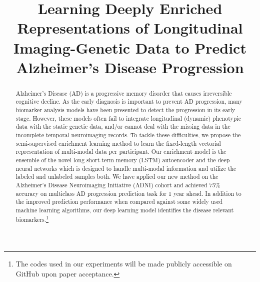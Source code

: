 \documentclass[runningheads]{llncs}
\begin{document}
%
\title{Learning Deeply Enriched Representations of Longitudinal Imaging-Genetic Data to Predict Alzheimer's Disease Progression}
%
%
%
%
%
\maketitle              %
%
\begin{abstract}
Alzheimer’s Disease (AD) is a progressive memory disorder that causes irreversible cognitive decline. As the early diagnosis is important to prevent AD progression, many biomarker analysis models have been presented to detect the progression in its early stage. However, these models often fail to integrate longitudinal (dynamic) phenotypic data with the static genetic data, and/or cannot deal with the missing data in the incomplete temporal neuroimaging records. To tackle these difficulties, we propose the semi-supervised enrichment learning method to learn the fixed-length vectorial representation of multi-modal data per participant. Our enrichment model is the ensemble of the novel long short-term memory (LSTM) autoencoder and the deep neural networks which is designed to handle multi-modal information and utilize the labeled and unlabeled samples both. We have applied our new method on the Alzheimer's Disease Neuroimaging Initiative (ADNI) cohort and achieved 75\% accuracy on multiclass AD progression prediction task for 1 year ahead. In addition to the improved prediction performance when compared against some widely used machine learning algorithms, our deep learning model identifies the disease relevant biomarkers.\footnote{The codes used in our experiments will be made publicly accessible on GitHub upon paper acceptance.}
\end{abstract}
\end{document}
